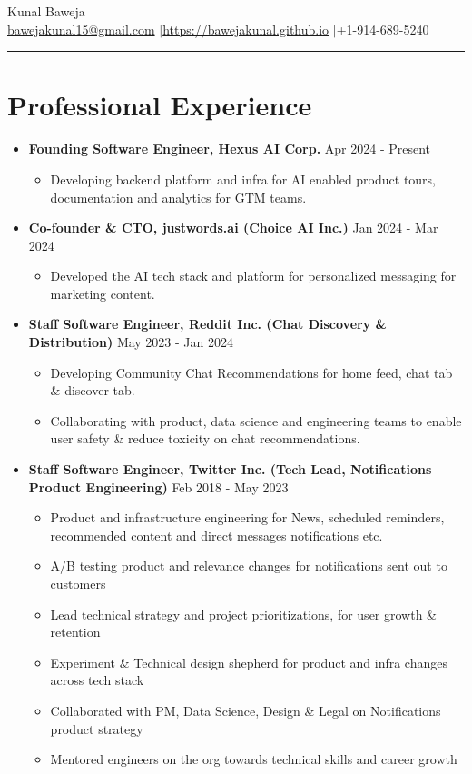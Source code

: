 \documentclass{article}
\def\name{Kunal Baweja}
\newcommand{\bi}{\vspace{-1mm}\begin{itemize}[align=left,leftmargin=*, rightmargin=80pt, labelindent=0pt,labelsep=2pt, label={-}, nosep]}
\newcommand{\ei}{\end{itemize}}
\begin{document}
\begin{center}
{\huge \name}\\
\href{mailto:bawejakunal15@gmail.com}{bawejakunal15@gmail.com} $|$\hspace{3pt}\href{https://bawejakunal.github.io}{https://bawejakunal.github.io} $|$\hspace{3pt}+1-914-689-5240
\end{center}

\hrule
\vspace{5pt}

\vspace{-1mm}
\section*{Professional Experience}
\begin{itemize}

    \item \textbf{Founding Software Engineer, Hexus AI Corp.} {\hfill Apr 2024 - Present}
    \bi
        \item Developing backend platform and infra for AI enabled product tours, documentation and analytics for GTM teams.
    \ei

    \item \textbf{Co-founder \& CTO, justwords.ai (Choice AI Inc.)} {\hfill Jan 2024 - Mar 2024}
    \bi
        \item Developed the AI tech stack and platform for personalized messaging for marketing content.
    \ei

    \item \textbf{Staff Software Engineer, Reddit Inc. (Chat Discovery \& Distribution)} {\hfill May 2023 - Jan 2024}
    \bi
        \item Developing Community Chat Recommendations for home feed, chat tab \& discover tab.
        \item Collaborating with product, data science and engineering teams to enable user safety \& reduce toxicity on chat recommendations.
    \ei
    
    \item \textbf{Staff Software Engineer, Twitter Inc. (Tech Lead, Notifications Product Engineering)} {\hfill Feb 2018 - May 2023}
    \bi
      \item Product and infrastructure engineering for News, scheduled reminders, recommended content and direct messages notifications etc.
      \item A/B testing product and relevance changes for notifications sent out to customers
      \item Lead technical strategy and project prioritizations, for user growth \& retention
      \item Experiment \& Technical design shepherd for product and infra changes across tech stack
      \item Collaborated with PM, Data Science, Design \& Legal on Notifications product strategy
      \item Mentored engineers on the org towards technical skills and career growth
    \ei


\end{itemize}
\end{document}
